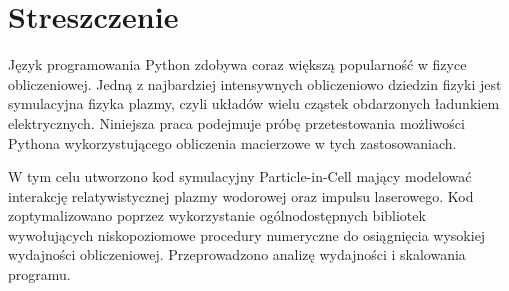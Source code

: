 \section{Streszczenie}

Język programowania Python zdobywa coraz większą popularność w fizyce obliczeniowej.
Jedną z najbardziej intensywnych obliczeniowo dziedzin fizyki jest symulacyjna fizyka
plazmy, czyli układów wielu cząstek obdarzonych ładunkiem elektrycznych.
Niniejsza praca podejmuje próbę przetestowania możliwości Pythona wykorzystującego 
obliczenia macierzowe w tych zastosowaniach.

W tym celu
utworzono kod symulacyjny Particle-in-Cell mający modelować interakcję relatywistycznej plazmy wodorowej oraz
impulsu laserowego. Kod zoptymalizowano poprzez wykorzystanie ogólnodostępnych bibliotek 
wywołujących niskopoziomowe procedury numeryczne do osiągnięcia wysokiej wydajności obliczeniowej. Przeprowadzono 
analizę wydajności i skalowania programu.
